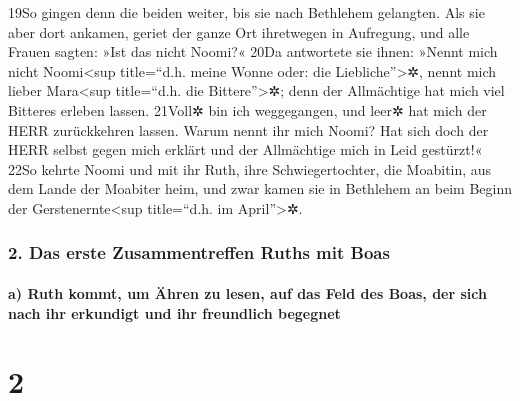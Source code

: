 19So gingen denn die beiden weiter, bis sie nach Bethlehem gelangten.
Als sie aber dort ankamen, geriet der ganze Ort ihretwegen in Aufregung,
und alle Frauen sagten: »Ist das nicht Noomi?« 20Da antwortete sie
ihnen: »Nennt mich nicht Noomi\textless sup title=``d.h. meine Wonne
oder: die Liebliche''\textgreater✲, nennt mich lieber Mara\textless sup
title=``d.h. die Bittere''\textgreater✲; denn der Allmächtige hat mich
viel Bitteres erleben lassen. 21Voll✲ bin ich weggegangen, und leer✲ hat
mich der HERR zurückkehren lassen. Warum nennt ihr mich Noomi? Hat sich
doch der HERR selbst gegen mich erklärt und der Allmächtige mich in Leid
gestürzt!« 22So kehrte Noomi und mit ihr Ruth, ihre Schwiegertochter,
die Moabitin, aus dem Lande der Moabiter heim, und zwar kamen sie in
Bethlehem an beim Beginn der Gerstenernte\textless sup title=``d.h. im
April''\textgreater✲.

\hypertarget{das-erste-zusammentreffen-ruths-mit-boas}{%
\subsubsection{2. Das erste Zusammentreffen Ruths mit
Boas}\label{das-erste-zusammentreffen-ruths-mit-boas}}

\hypertarget{a-ruth-kommt-um-uxe4hren-zu-lesen-auf-das-feld-des-boas-der-sich-nach-ihr-erkundigt-und-ihr-freundlich-begegnet}{%
\paragraph{a) Ruth kommt, um Ähren zu lesen, auf das Feld des Boas, der
sich nach ihr erkundigt und ihr freundlich
begegnet}\label{a-ruth-kommt-um-uxe4hren-zu-lesen-auf-das-feld-des-boas-der-sich-nach-ihr-erkundigt-und-ihr-freundlich-begegnet}}

\hypertarget{section-1}{%
\section{2}\label{section-1}}

